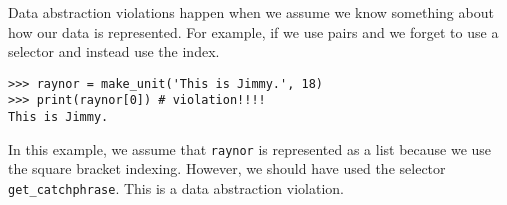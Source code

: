 Data abstraction violations happen when we assume we know something about how
our data is represented. For example, if we use pairs and we forget to use a
selector and instead use the index.

\begin{lstlisting}
>>> raynor = make_unit('This is Jimmy.', 18)
>>> print(raynor[0]) # violation!!!!
This is Jimmy.
\end{lstlisting}

In this example, we assume that {\tt raynor} is represented as a list because
we use the square bracket indexing. However, we should have used the selector
{\tt get\_catchphrase}. This is a data abstraction violation.
